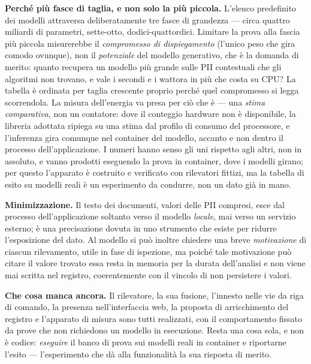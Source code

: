 \textbf{Perché più fasce di taglia, e non solo la più piccola.} L'elenco predefinito dei modelli attraversa deliberatamente tre fasce di grandezza --- circa quattro miliardi di parametri, sette-otto, dodici-quattordici. Limitare la prova alla fascia più piccola misurerebbe il \emph{compromesso di dispiegamento} (l'unico peso che gira comodo ovunque), non il \emph{potenziale} del modello generativo, che è la domanda di merito: quanto recupera un modello più grande sulle PII contestuali che gli algoritmi non trovano, e vale i secondi e i wattora in più che costa su CPU? La tabella è ordinata per taglia crescente proprio perché quel compromesso si legga scorrendola. La misura dell'energia va presa per ciò che è --- una \emph{stima comparativa}, non un contatore: dove il conteggio hardware non è disponibile, la libreria adottata ripiega su una stima dal profilo di consumo del processore, e l'inferenza gira comunque nel container del modello, accanto e non dentro il processo dell'applicazione. I numeri hanno senso gli uni rispetto agli altri, non in assoluto, e vanno prodotti eseguendo la prova in container, dove i modelli girano; per questo l'apparato è costruito e verificato con rilevatori fittizi, ma la tabella di esito su modelli reali è un esperimento da condurre, non un dato già in mano. \medskip

\textbf{Minimizzazione.} Il testo dei documenti, valori delle PII compresi, esce dal processo dell'applicazione soltanto verso il modello \emph{locale}, mai verso un servizio esterno; è una precisazione dovuta in uno strumento che esiste per ridurre l'esposizione del dato. Al modello si può inoltre chiedere una breve \emph{motivazione} di ciascun rilevamento, utile in fase di ispezione, ma poiché tale motivazione può citare il valore trovato essa resta in memoria per la durata dell'analisi e non viene mai scritta nel registro, coerentemente con il vincolo di non persistere i valori. \medskip

\textbf{Che cosa manca ancora.} Il rilevatore, la sua fusione, l'innesto nelle vie da riga di comando, la presenza nell'interfaccia web, la proposta di arricchimento del registro e l'apparato di misura sono tutti realizzati, con il comportamento fissato da prove che non richiedono un modello in esecuzione. Resta una cosa sola, e non è codice: \emph{eseguire} il banco di prova sui modelli reali in container e riportarne l'esito --- l'esperimento che dà alla funzionalità la sua risposta di merito. \medskip
